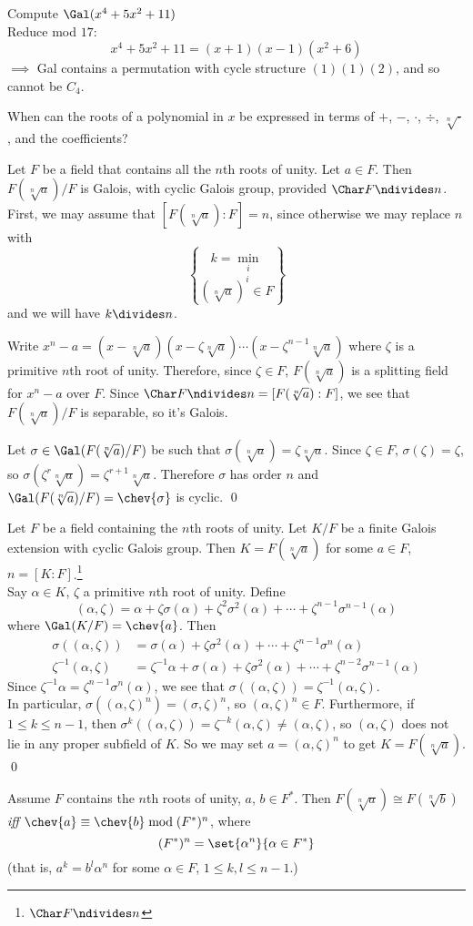 Compute $\Gal(x^4+5x^2+11)$ \\
Reduce mod $17$:
\[ x^4+5x^2+11 = (x+1)(x-1)(x^2+6) \]
$\implies$ Gal contains a permutation with cycle structure $(1)(1)(2)$, and so cannot be $C_4$.

When can the roots of a polynomial in $x$ be expressed in terms of $+$, $-$, $\cdot$, $\div$, $\sqrt[n]{\cdot}$, and the coefficients?

\thm Let $F$ be a field that contains all the $n$th roots of unity.  Let $a\in F$.  Then $F(\sqrt[n]{a})/F$ is Galois, with cyclic Galois group, provided $\Char F\ndivides n$. \\
\pf First, we may assume that $[F(\sqrt[n]{a}):F]=n$, since otherwise we may replace $n$ with
\[ k = \min_i\brace{(\sqrt[n]{a})^i\in F} \]
and we will have $k\divides n$.

Write $x^n-a=(x-\sqrt[n]{a})(x-\zeta\sqrt[n]{a})\dotsm(x-\zeta^{n-1}\sqrt[n]{a})$
where $\zeta$ is a primitive $n$th root of unity.  Therefore, since $\zeta\in F$, $F(\sqrt[n]{a})$ is a splitting field for $x^n-a$ over $F$.  Since $\Char F\ndivides n=[F(\sqrt[n]{a}):F]$, we see that $F(\sqrt[n]{a})/F$ is separable, so it's Galois.

Let $\sigma\in\Gal(F(\sqrt[n]{a})/F)$ be such that $\sigma(\sqrt[n]{a})=\zeta\sqrt[n]{a}$.  Since $\zeta\in F$, $\sigma(\zeta)=\zeta$, so $\sigma(\zeta^r\sqrt[n]{a})=\zeta^{r+1}\sqrt[n]{a}$.  Therefore $\sigma$ has order $n$ and $\Gal(F(\sqrt[n]{a})/F)=\chev{\sigma}$ is cyclic. \qed

\thm Let $F$ be a field containing the $n$th roots of unity.  Let $K/F$ be a finite Galois extension with cyclic Galois group.  Then $K=F(\sqrt[n]{a})$ for some $a\in F$, $n=[K:F]$.\footnote{$\Char F\ndivides n$} \\
\pf Say $\alpha\in K$, $\zeta$ a primitive $n$th root of unity.  Define
\[ (\alpha,\zeta) = \alpha + \zeta\sigma(\alpha) + \zeta^2\sigma^2(\alpha) + \dotsb + \zeta^{n-1}\sigma^{n-1}(\alpha) \]
where $\Gal(K/F)=\chev{a}$.  Then
\begin{align*}
\sigma((\alpha,\zeta)) &= \sigma(\alpha) + \zeta\sigma^2(\alpha) + \dotsb + \zeta^{n-1}\sigma^n(\alpha) \\
\zeta^{-1}(\alpha,\zeta) &= \zeta^{-1}\alpha + \sigma(\alpha) + \zeta\sigma^2(\alpha) + \dotsb + \zeta^{n-2}\sigma^{n-1}(\alpha)
\end{align*}
Since $\zeta^{-1}\alpha=\zeta^{n-1}\sigma^n(\alpha)$, we see that $\sigma((\alpha,\zeta))=\zeta^{-1}(\alpha,\zeta)$. \\
In particular, $\sigma((\alpha,\zeta)^n)=(\sigma,\zeta)^n$, so $(\alpha,\zeta)^n\in F$.  Furthermore, if $1\leq k\leq n-1$, then $\sigma^k((\alpha,\zeta))=\zeta^{-k}(\alpha,\zeta)\neq(\alpha,\zeta)$, so $(\alpha,\zeta)$ does not lie in any proper subfield of $K$.  So we may set $a=(\alpha,\zeta)^n$ to get $K=F(\sqrt[n]{a})$. \qed

\thm Assume $F$ contains the $n$th roots of unity, $a$, $b\in F^*$.  Then $F(\sqrt[n]{a})\cong F(\sqrt[n]{b})$ \emph{iff} $\chev{a}\equiv \chev{b} \bmod (F^*)^n$, where
\[ (F^*)^n = \set{\alpha^n}{\alpha\in F^*} \]
(that is, $a^k=b^l\alpha^n$ for some $\alpha\in F$, $1\leq k,l\leq n-1$.)
